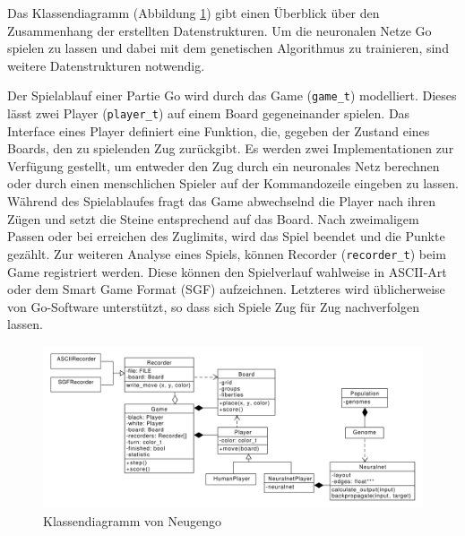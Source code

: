 Das Klassendiagramm (Abbildung \ref{fig:class_diagram}) gibt einen Überblick
über den Zusammenhang der erstellten Datenstrukturen. Um die neuronalen Netze
Go spielen zu lassen und dabei mit dem genetischen Algorithmus zu trainieren,
sind weitere Datenstrukturen notwendig.

Der Spielablauf einer Partie Go wird durch das Game (\texttt{game\_t})
modelliert. Dieses lässt zwei Player (\texttt{player\_t}) auf einem Board
gegeneinander spielen. Das Interface eines Player definiert eine Funktion, die,
gegeben der Zustand eines Boards, den zu spielenden Zug zurückgibt. Es werden
zwei Implementationen zur Verfügung gestellt, um entweder den Zug durch ein
neuronales Netz berechnen oder durch einen menschlichen Spieler auf der
Kommandozeile eingeben zu lassen. Während des Spielablaufes fragt das Game
abwechselnd die Player nach ihren Zügen und setzt die Steine entsprechend auf
das Board. Nach zweimaligem Passen oder bei erreichen des Zuglimits, wird das
Spiel beendet und die Punkte gezählt.
Zur weiteren Analyse eines Spiels, können Recorder (\texttt{recorder\_t}) beim
Game registriert werden. Diese können den Spielverlauf wahlweise in ASCII-Art
oder dem Smart Game Format (SGF)\cite{sgf} aufzeichnen. Letzteres wird
üblicherweise von Go-Software unterstützt, so dass sich Spiele Zug für Zug
nachverfolgen lassen.

\begin{figure}
    \centering
    \includegraphics[width=\textwidth]{content/img/class_diagram}
    \caption{Klassendiagramm von Neugengo}
    \label{fig:class_diagram}
\end{figure}

